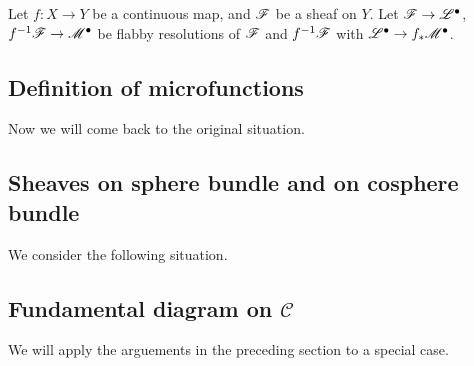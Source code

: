 \begin{rem}
    Let \(f\colon X\to Y\) be a continuous map, 
    and \(\mathscr{F}\) be a sheaf on \(Y\). 
    Let \(\mathscr{F}\to \mathscr{L}^\bullet\), 
    \(f^{-1}\mathscr{F}\to\mathscr{M}^\bullet\) be flabby resolutions 
    of \(\mathscr{F}\) and \(f^{-1}\mathscr{F}\) with \(
        \mathscr{L}^\bullet\to f_\ast\mathscr{M}^\bullet
    \).
\end{rem}
\subsection{Definition of microfunctions}


Now we will come back to the original situation. 




\subsection{Sheaves on sphere bundle and on cosphere bundle}


We consider the following situation.



\subsection{Fundamental diagram on $\mathscr{C}$}


We will apply the arguements in the preceding section 
to a special case.
